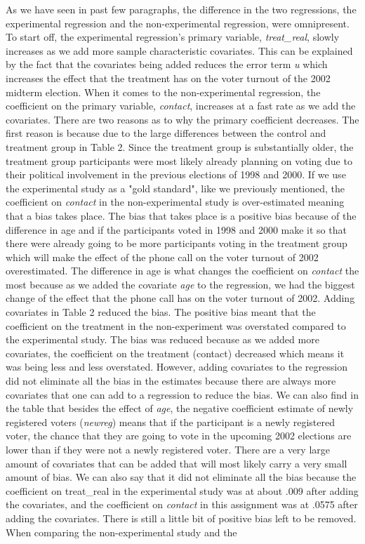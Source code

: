 \documentclass[a4paper]{article}
\begin{document}
\begin{flushleft}

As we have seen in past few paragraphs, the difference in the two regressions, the experimental regression and the non-experimental regression, were omnipresent. To start off, the experimental regression's primary variable, \textit{treat\_real}, slowly increases as we add more sample characteristic covariates. This can be explained by the fact that the covariates being added reduces the error term \textit{u} which increases the effect that the treatment has on the voter turnout of the 2002 midterm election. When it comes to the non-experimental regression, the coefficient on the primary variable, \textit{contact}, increases at a fast rate as we add the covariates. There are two reasons as to why the primary coefficient decreases. The first reason is because due to the large differences between the control and treatment group in Table 2. Since the treatment group is substantially older, the treatment group participants were most likely already planning on voting due to their political involvement in the previous elections of 1998 and 2000. If we use the experimental study as a "gold standard", like we previously mentioned, the coefficient on \textit{contact} in the non-experimental study is over-estimated meaning that a bias takes place. The bias that takes place is a positive bias because of the difference in age and if the participants voted in 1998 and 2000 make it so that there were already going to be more participants voting in the treatment group which will make the effect of the phone call on the voter turnout of 2002 overestimated. The difference in age is what changes the coefficient on \textit{contact} the most because as we added the covariate \textit{age} to the regression, we had the biggest change of the effect that the phone call has on the voter turnout of 2002. Adding covariates in Table 2 reduced the bias. The positive bias meant that the coefficient on the treatment in the non-experiment was overstated compared to the experimental study. The bias was reduced because as we added more covariates, the coefficient on the treatment (contact) decreased which means it was being less and less overstated. However, adding covariates to the regression did not eliminate all the bias in the estimates because there are always more covariates that one can add to a regression to reduce the bias. We can also find in the table that besides the effect of \textit{age}, the negative coefficient estimate of newly registered voters (\textit{newreg}) means that if the participant is a newly registered voter, the chance that they are going to vote in the upcoming 2002 elections are lower than if they were not a newly registered voter. There are a very large amount of covariates that can be added that will most likely carry a very small amount of bias. We can also say that it did not eliminate all the bias because the coefficient on treat\_real in the experimental study was at about .009 after adding the covariates, and the coefficient on \textit{contact} in this assignment was at .0575 after adding the covariates. There is still a little bit of positive bias left to be removed. When comparing the non-experimental study and the 
\end{flushleft}
\end{document}
